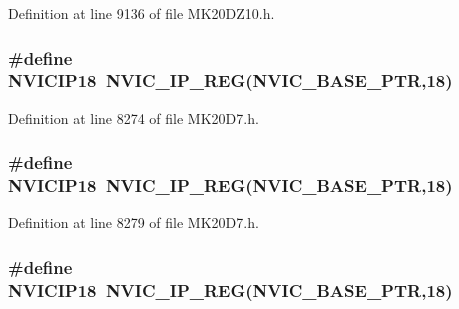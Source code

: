 Definition at line 9136 of file M\+K20\+D\+Z10.\+h.

\subsubsection[{\texorpdfstring{N\+V\+I\+C\+I\+P18}{NVICIP18}}]{\setlength{\rightskip}{0pt plus 5cm}\#define N\+V\+I\+C\+I\+P18~{\bf N\+V\+I\+C\+\_\+\+I\+P\+\_\+\+R\+EG}({\bf N\+V\+I\+C\+\_\+\+B\+A\+S\+E\+\_\+\+P\+TR},18)}\hypertarget{group___n_v_i_c___register___accessor___macros_ga95564aca0fb26f0e95c3e20a69deb277}{}\label{group___n_v_i_c___register___accessor___macros_ga95564aca0fb26f0e95c3e20a69deb277}


Definition at line 8274 of file M\+K20\+D7.\+h.

\subsubsection[{\texorpdfstring{N\+V\+I\+C\+I\+P18}{NVICIP18}}]{\setlength{\rightskip}{0pt plus 5cm}\#define N\+V\+I\+C\+I\+P18~{\bf N\+V\+I\+C\+\_\+\+I\+P\+\_\+\+R\+EG}({\bf N\+V\+I\+C\+\_\+\+B\+A\+S\+E\+\_\+\+P\+TR},18)}\hypertarget{group___n_v_i_c___register___accessor___macros_ga95564aca0fb26f0e95c3e20a69deb277}{}\label{group___n_v_i_c___register___accessor___macros_ga95564aca0fb26f0e95c3e20a69deb277}


Definition at line 8279 of file M\+K20\+D7.\+h.

\subsubsection[{\texorpdfstring{N\+V\+I\+C\+I\+P18}{NVICIP18}}]{\setlength{\rightskip}{0pt plus 5cm}\#define N\+V\+I\+C\+I\+P18~{\bf N\+V\+I\+C\+\_\+\+I\+P\+\_\+\+R\+EG}({\bf N\+V\+I\+C\+\_\+\+B\+A\+S\+E\+\_\+\+P\+TR},18)}\hypertarget{group___n_v_i_c___register___accessor___macros_ga95564aca0fb26f0e95c3e20a69deb277}{}\label{group___n_v_i_c___register___accessor___macros_ga95564aca0fb26f0e95c3e20a69deb277}


